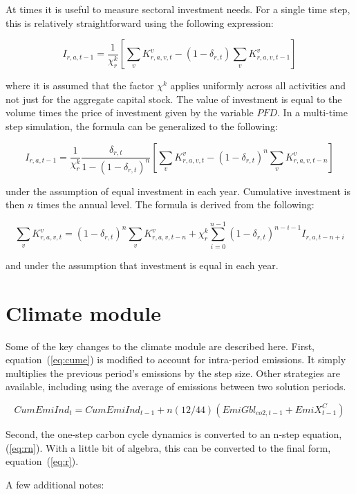 At times it is useful to measure sectoral investment needs. For a single time
step, this is relatively straightforward using the following expression:

\[
I_{r,a,t-1} =
   \frac{1}{\chi^k_r} \left[\sum_v{K^v_{r,a,v,t}}
-  (1-\delta_{r,t}) \sum_v{K^v_{r,a,v,t-1}} \right]
\]

\noindent where it is assumed that the factor $\chi^k$ applies uniformly across
all activities and not just for the aggregate capital stock. The value of
investment is equal to the volume times the price of investment given by the
variable $\mathit{PFD}$. In a multi-time step simulation, the formula can be
generalized to the following:

\[
I_{r,a,t-1} =
   \frac{1}{\chi^k_r} \frac {\delta_{r,t}}{1-(1-\delta_{r,t})^n}
      \left[\sum_v{K^v_{r,a,v,t}} - (1-\delta_{r,t})^n \sum_v{K^v_{r,a,v,t-n}}
      \right]
\]

\noindent under the assumption of equal investment in each year. Cumulative
investment is then $n$ times the annual level. The formula is derived from the
following:

\[
\sum_v{K^v_{r,a,v,t}} =
   (1-\delta_{r,t})^n \sum_v{K^v_{r,a,v,t-n}}
+  \chi^k_r \sum_{i=0}^{n-1}{(1-\delta_{r,t})^{n-i-1}I_{r,a,t-n+i}}
\]

\noindent and under the assumption that investment is equal in each year.

\section{Climate module}

Some of the key changes to the climate module are described
here. First, equation~(\ref{eq:cume}) is modified to account
for intra-period emissions. It simply multiplies the previous period's 
emissions by the step size.
Other strategies are available, including using the average
of emissions between two solution periods.

\begin{equation}
\label{eq:cumemstep}
\mathit{CumEmiInd}_t = \mathit{CumEmiInd}_{t-1} 
+ n (12/44) \left(\mathit{EmiGbl}_{\mathit{co2},t-1}
 + \mathit{EmiX}^C_{t-1} \right)
\end{equation}

Second, the one-step carbon cycle dynamics is converted to an n-step
equation, (\ref{eq:rn}). With a little bit of algebra, this
can be converted to the final form, equation~(\ref{eq:r}).

A few additional notes:

